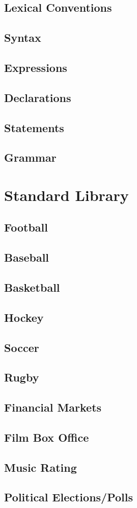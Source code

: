 \documentclass[12pt]{report}
\begin{document}
\section{Lexical Conventions}
\section{Syntax}
\section{Expressions}
\section{Declarations}
\section{Statements}
\section{Grammar}

\chapter{Standard Library}
\section{Football}
\section{Baseball}
\section{Basketball}
\section{Hockey}
\section{Soccer}
\section{Rugby}
\section{Financial Markets}
\section{Film Box Office}
\section{Music Rating}
\section{Political Elections/Polls}
\end{document}
